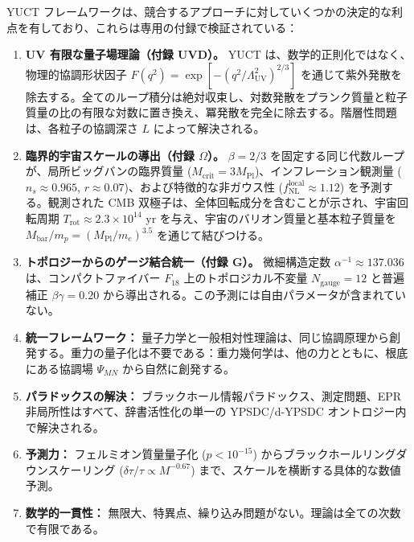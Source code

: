 \documentclass[11pt,a4paper]{article}
\theoremstyle{remark}
\begin{document}
	YUCT フレームワークは、競合するアプローチに対していくつかの決定的な利点を有しており、これらは専用の付録で検証されている：
	
	\begin{enumerate}
		\item \textbf{UV 有限な量子場理論（付録 UVD）。}
		YUCT は、数学的正則化ではなく、物理的協調形状因子 $F(q^2)=\exp[-(q^2/\Lambda_{\mathrm{UV}}^2)^{2/3}]$ を通じて紫外発散を除去する。全てのループ積分は絶対収束し、対数発散をプランク質量と粒子質量の比の有限な対数に置き換え、冪発散を完全に除去する。階層性問題は、各粒子の協調深さ $L$ によって解決される。
		
		\item \textbf{臨界的宇宙スケールの導出（付録 $\Omega$）。}
		$\beta=2/3$ を固定する同じ代数ループが、局所ビッグバンの臨界質量 ($M_{\mathrm{crit}}=3M_{\mathrm{Pl}}$)、インフレーション観測量 ($n_s\approx0.965$, $r\approx0.07$)、および特徴的な非ガウス性 ($f_{\mathrm{NL}}^{\mathrm{local}}\approx1.12$) を予測する。観測された CMB 双極子は、全体回転成分を含むことが示され、宇宙回転周期 $T_{\mathrm{rot}}\approx2.3\times10^{14}$ yr を与え、宇宙のバリオン質量と基本粒子質量を $M_{\mathrm{bar}}/m_p=(M_{\mathrm{Pl}}/m_e)^{3.5}$ を通じて結びつける。
		
		\item \textbf{トポロジーからのゲージ結合統一（付録 G）。}
		微細構造定数 $\alpha^{-1}\approx137.036$ は、コンパクトファイバー $F_{18}$ 上のトポロジカル不変量 $N_{\mathrm{gauge}}=12$ と普遍補正 $\beta\gamma=0.20$ から導出される。この予測には自由パラメータが含まれていない。
		
		\item \textbf{統一フレームワーク：} 量子力学と一般相対性理論は、同じ協調原理から創発する。重力の量子化は不要である：重力幾何学は、他の力とともに、根底にある協調場 $\Psi_{MN}$ から自然に創発する。
		
		\item \textbf{パラドックスの解決：} ブラックホール情報パラドックス、測定問題、EPR 非局所性はすべて、辞書活性化の単一の YPSDC/d-YPSDC オントロジー内で解決される。
		
		\item \textbf{予測力：} フェルミオン質量量子化 ($p<10^{-15}$) からブラックホールリングダウンスケーリング ($\delta\tau/\tau\propto M^{-0.67}$) まで、スケールを横断する具体的な数値予測。
		
		\item \textbf{数学的一貫性：} 無限大、特異点、繰り込み問題がない。理論は全ての次数で有限である。
	\end{enumerate}
	
\end{document}
